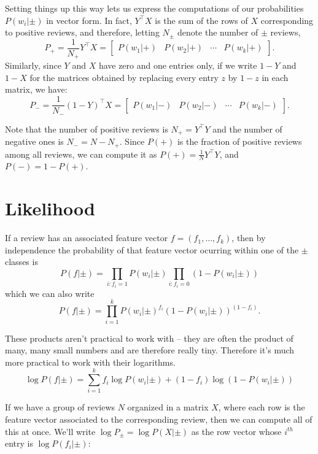 \documentclass[
  oneside]{scrbook}
\begin{document}
Setting things up this way lets us express the computations of our
probabilities \(P(w_{i}|\pm)\) in vector form. In fact,
\(Y^{\intercal}X\) is the sum of the rows of \(X\) corresponding to
positive reviews, and therefore, letting \(N_{\pm}\) denote the number
of \(\pm\) reviews, \[
P_{+} = \frac{1}{N_{+}}Y^{\intercal}X = \left[\begin{array}{cccc} P(w_{1}|+)& P(w_{2}|+) & \cdots &P(w_{k}|+)\end{array}\right].
\] Similarly, since \(Y\) and \(X\) have zero and one entries only, if
we write \(1-Y\) and \(1-X\) for the matrices obtained by replacing
every entry \(z\) by \(1-z\) in each matrix, we have: \[
P_{-} = \frac{1}{N_{-}}(1-Y)^{\intercal}X =  \left[\begin{array}{cccc} P(w_{1}|-)& P(w_{2}|-) & \cdots &P(w_{k}|-)\end{array}\right].
\]

Note that the number of positive reviews is \(N_{+}=Y^{\intercal}Y\) and
the number of negative ones is \(N_{-}=N-N_{+}\). Since \(P(+)\) is the
fraction of positive reviews among all reviews, we can compute it as
\(P(+)=\frac{1}{N}Y^{\intercal}Y\), and \(P(-)=1-P(+)\).

\hypertarget{likelihood}{%
\section{Likelihood}\label{likelihood}}

If a review has an associated feature vector \(f=(f_1,\ldots, f_k)\),
then by independence the probability of that feature vector ocurring
within one of the \(\pm\) classes is \[
P(f|\pm) = \prod_{i: f_{i}=1} P(w_{i}|\pm)\prod_{i: f_{i}=0}(1-P(w_{i}|\pm))
\] which we can also write \begin{equation}
P(f|\pm) = \prod_{i=1}^{k} P(w_{i}|\pm)^{f_{i}}(1-P(w_{i}|\pm))^{(1-f_{i})}.
\label{eq:likelihood}\end{equation}

These products aren't practical to work with -- they are often the
product of many, many small numbers and are therefore really tiny.
Therefore it's much more practical to work with their logarithms.
\begin{equation}
\log P(f|\pm) = \sum_{i=1}^{k} f_{i}\log P(w_{i}|\pm) + (1-f_{i})\log(1-P(w_{i}|\pm))
\label{eq:loglikelihood}\end{equation}

If we have a group of reviews \(N\) organized in a matrix \(X\), where
each row is the feature vector associated to the corresponding review,
then we can compute all of this at once. We'll write
\(\log P_{\pm}=\log P(X|\pm)\) as the row vector whose \(i^{th}\) entry
is \(\log P(f_{i}|\pm)\):
\end{document}
